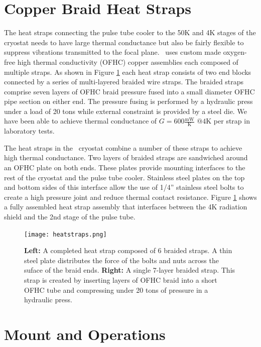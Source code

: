 \documentclass[]{spie}  %
\begin{document}
\section{Copper Braid Heat Straps}

The heat straps connecting the pulse tube cooler to the 50K and 4K stages of
the cryostat needs to have large thermal conductance but also be fairly
flexible to suppress vibrations transmitted to the focal plane. \biceparray\ 
uses custom made oxygen-free high thermal conductivity (OFHC) copper
assemblies each composed of multiple straps. As shown
in Figure \ref{fig:heatstrap} each heat strap consists of two end blocks
connected by a series of multi-layered braided wire straps. The braided straps
comprise seven layers of OFHC braid pressure fused into a small diameter OFHC
pipe section on either end. The pressure fusing is performed by a hydraulic
press under a load of 20 tons while external constraint is provided by a steel
die. We have been able to achieve thermal conductance of $G=600
\frac{\text{mW}}{\text{K}} \text{  @}4\text{K}$ per strap in laboratory tests.

The heat straps in the \biceparray\ cryostat combine a number of these straps
to achieve high thermal conductance. Two layers of braided straps are
sandwiched around an OFHC plate on both ends. These plates provide mounting
interfaces to the rest of the cryostat and the pulse tube cooler. Stainless
steel plates on the top and bottom sides of this interface allow the use of
1/4'' stainless steel bolts to create a high pressure joint and reduce thermal
contact resistance. Figure \ref{fig:heatstrap} shows a fully assembled heat
strap assembly that interfaces between the 4K radiation shield and the 2nd
stage of the pulse tube.

\clearpage


\begin{figure}[ht]
\center
\texttt{[image: heatstraps.png]}
\caption{\textbf{Left:} A completed heat strap composed of 6 braided straps. A thin steel plate distributes the force of the bolts and nuts across the suface of the braid ends. \textbf{Right:} A single 7-layer braided strap. This strap is created by inserting layers of OFHC braid into a short OFHC tube and compressing under 20 tons of pressure in a hydraulic press.}
\label{fig:heatstrap}
\end{figure}


\section{Mount and Operations}
\end{document}
